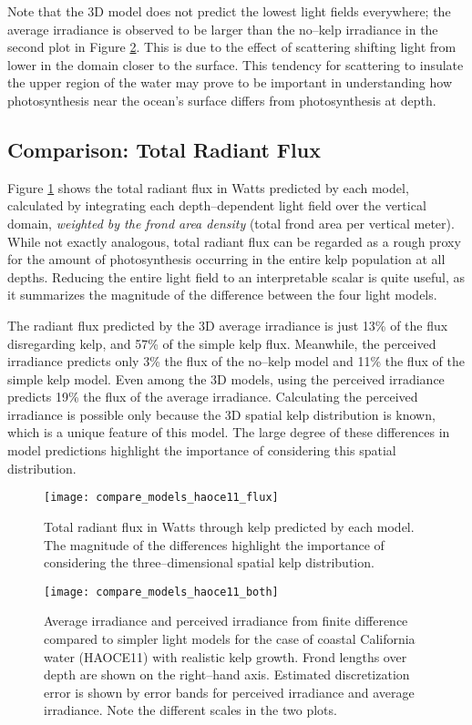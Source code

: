 Note that the 3D model does not predict the lowest light fields everywhere; the average irradiance is observed to be larger than the no--kelp irradiance in the second plot in Figure \ref{fig:compare_models_haoce11_both}.
This is due to the effect of scattering shifting light from lower in the domain closer to the surface.
This tendency for scattering to insulate the upper region of the water may prove to be important in understanding how photosynthesis near the ocean's surface differs from photosynthesis at depth.

\subsection{Comparison: Total Radiant Flux}
Figure \ref{fig:compare_models_haoce11_flux} shows the total radiant flux in Watts predicted by each model, calculated by integrating each depth--dependent light field over the vertical domain, \textit{weighted by the frond area density} (total frond area per vertical meter).
While not exactly analogous, total radiant flux can be regarded as a rough proxy for the amount of photosynthesis occurring in the entire kelp population at all depths.
Reducing the entire light field to an interpretable scalar is quite useful, as it summarizes the magnitude of the difference between the four light models.

The radiant flux predicted by the 3D average irradiance is just 13\% of the flux disregarding kelp, and 57\% of the simple kelp flux.
Meanwhile, the perceived irradiance predicts only 3\% the flux of the no--kelp model and 11\% the flux of the simple kelp model.
Even among the 3D models, using the perceived irradiance predicts 19\% the flux of the average irradiance.
Calculating the perceived irradiance is possible only because the 3D spatial kelp distribution is known, which is a unique feature of this model.
The large degree of these differences in model predictions highlight the importance of considering this spatial distribution.

\begin{figure}[H]
  \centering
  \texttt{[image: compare\_models\_haoce11\_flux]}
  \caption{Total radiant flux in Watts through kelp predicted by each model. The magnitude of the differences highlight the importance of considering the three--dimensional spatial kelp distribution.}
  \label{fig:compare_models_haoce11_flux}
\end{figure}

\begin{figure}[H]
  \centering
  \texttt{[image: compare\_models\_haoce11\_both]}
  \caption{Average irradiance and perceived irradiance from finite difference compared to simpler light models for the case of coastal California water (HAOCE11) with realistic kelp growth. Frond lengths over depth are shown on the right--hand axis. Estimated discretization error is shown by error bands for perceived irradiance and average irradiance. Note the different scales in the two plots.}
  \label{fig:compare_models_haoce11_both}
\end{figure}

